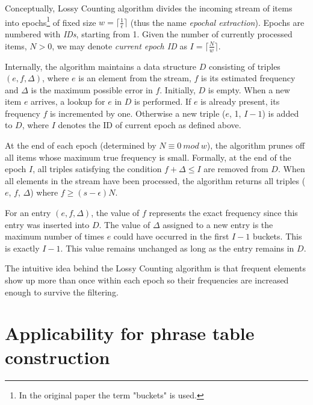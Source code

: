 Conceptually, Lossy Counting algorithm divides the incoming stream of items
into epochs\footnote{In the original paper the term "buckets" is used.}
of fixed size $w = \lceil \frac{1}{\epsilon} \rceil$
(thus the name \emph{epochal extraction}).
Epochs are numbered with \emph{IDs}, starting from 1.
Given the number of currently processed items, $N > 0$, we may denote
\emph{current epoch ID} as $I = \lceil \frac{N}{w} \rceil$.

Internally, the algorithm maintains a data structure $D$ consisting of triples
$(e, f, \Delta)$, where $e$ is an element from the stream, $f$ is its estimated
frequency and $\Delta$ is the maximum possible error in $f$.
Initially, $D$ is empty.
When a new item $e$ arrives, a lookup for $e$ in $D$ is performed.
If $e$ is already present, its frequency $f$ is incremented by one.
Otherwise a new triple ($e$, 1, $I-1$) is added to $D$,
where $I$ denotes the ID of current epoch as defined above.

At the end of each epoch (determined by $N \equiv 0~mod~w$), the algorithm
prunes off all items whose maximum true frequency is small.
Formally, at the end of the epoch $I$, all triples satisfying the condition
$f + \Delta \leq I$ are removed from $D$.
When all elements in the stream have been processed, the algorithm returns all
triples ($e$, $f$, $\Delta$) where $f \geq (s-\epsilon)N$.

For an entry $(e, f, \Delta)$, the value of $f$ represents the exact frequency
since this entry was inserted into $D$.
The value of $\Delta$ assigned to a new entry is the maximum number of times
$e$ could have occurred in the first $I-1$ buckets. This is exactly $I-1$.
This value remains unchanged as long as the entry remains in $D$.

The intuitive idea behind the Lossy Counting algorithm is that frequent elements
show up more than once within each epoch so their frequencies are increased enough
to survive the filtering.

\section{Applicability for phrase table construction}
